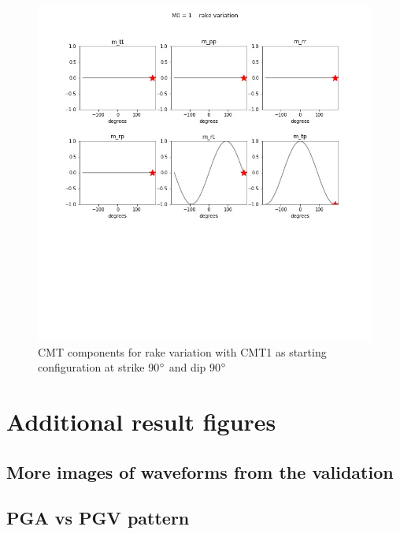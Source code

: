 \documentclass[../Text/00main.tex]{subfiles}
\begin{document}
\begin{figure}[htb!]
    \centering
    \includegraphics[width=1.0\textwidth, trim= 0cm 10cm 0cm 0cm,clip]{images_methods/rakevar.jpg}
    \caption{CMT components for rake variation with CMT1 as starting configuration at strike 90$\degree$ and dip 90$\degree$}
    \label{figapp: rakevar}
\end{figure}

\FloatBarrier

\chapter{Additional result figures}

\section{More images of waveforms from the validation}\label{app:validation}

\section{PGA vs PGV pattern}\label{app:PGAsame}
\end{document}
